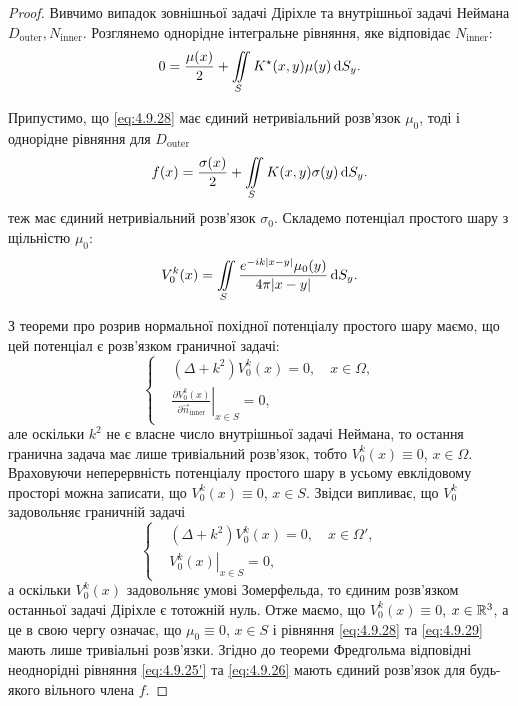 \begin{proof}
	Вивчимо випадок зовнішньої задачі Діріхле та внутрішньої задачі Неймана $D_{\text{outer}}, N_{\text{inner}}$. Розглянемо однорідне інтегральне рівняння, яке відповідає $N_{\text{inner}}$:
	\begin{equation}
		\label{eq:4.9.28}
		0 = \frac{\mu(x)}{2} + \displaystyle\iint\limits_S K^\star(x, y) \mu(y) \mathop{}\!\mathrm{d} S_y. 
	\end{equation}

	Припустимо, що \eqref{eq:4.9.28} має єдиний нетривіальний розв'язок $\mu_0$, тоді і однорідне рівняння для $D_{\text{outer}}$
	\begin{equation}
		\label{eq:4.9.29}
		f(x) = \frac{\sigma(x)}{2} + \displaystyle\iint\limits_S K(x, y) \sigma(y) \mathop{}\!\mathrm{d} S_y. 
	\end{equation}
	теж має єдиний нетривіальний розв'язок $\sigma_0$. Складемо потенціал простого шару з щільністю $\mu_0$:
	\begin{equation}
		V_0^k(x) = \displaystyle\iint\limits_S \frac{e^{-ik|x-y|}\mu_0(y)}{4\pi|x-y|}\mathop{}\!\mathrm{d} S_y.	
	\end{equation}

	З теореми про розрив нормальної похідної потенціалу простого шару маємо, що цей потенціал є розв'язком граничної задачі:
	\begin{equation}
		\left\{
			\begin{aligned}
				& (\Delta + k^2) V_0^k(x) = 0, \quad x \in \Omega, \\
				& \left. \frac{\partial V_0^k(x)}{\partial \vec n_{\text{inner}}} \right|_{x \in S} = 0,
			\end{aligned}
		\right.
	\end{equation}
	але оскільки $k^2$ не є власне число внутрішньої задачі Неймана, то остання гранична задача має лише тривіальний розв'язок, тобто $V_0^k(x) \equiv 0$, $x \in \Omega$. Враховуючи неперервність потенціалу простого шару в усьому евклідовому просторі можна записати, що $V_0^k(x) \equiv 0$, $x \in S$. Звідси випливає, що $V_0^k$ задовольняє граничній задачі
	\begin{equation}
		\left\{
			\begin{aligned}
				& (\Delta + k^2) V_0^k(x) = 0, \quad x \in \Omega', \\
				& \left. V_0^k(x) \right|_{x \in S} = 0,
			\end{aligned}
		\right.
	\end{equation}
	а оскільки $V_0^k(x)$ задовольняє умові Зомерфельда, то єдиним розв'язком останньої задачі Діріхле є тотожній нуль. Отже маємо, що $V_0^k(x) \equiv 0$, $x \in \mathbb{R}^3$, а це в свою чергу означає, що $\mu_0 \equiv 0$, $x \in S$ і рівняння \eqref{eq:4.9.28} та \eqref{eq:4.9.29} мають лише тривіальні розв'язки. Згідно до теореми Фредгольма відповідні неоднорідні рівняння \eqref{eq:4.9.25'} та \eqref{eq:4.9.26} мають єдиний розв'язок для будь-якого вільного члена $f$.
\end{proof}